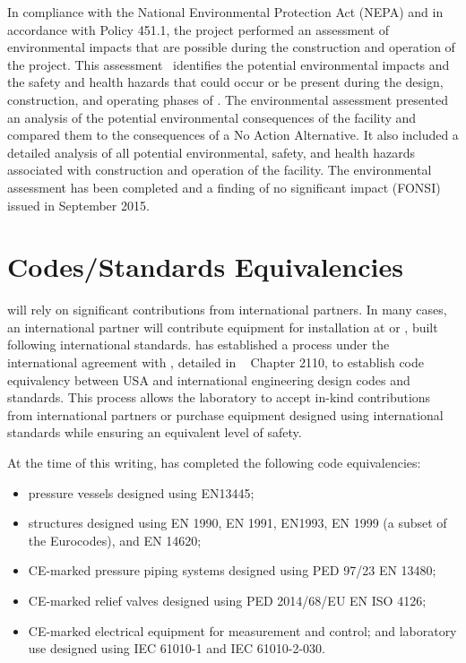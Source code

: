 In compliance with the National Environmental Protection Act (NEPA) and in
accordance with  Policy 451.1, the
 project performed an assessment  of %
environmental impacts that are possible during the construction and operation of the
project.  %
This assessment~\cite{bib:docdb122}   identifies the
potential environmental impacts and the safety and health hazards
that could occur or be present during the design, construction, and operating phases of
.  The environmental assessment presented an
analysis of the potential environmental consequences of the facility
and compared them to the consequences of a No Action Alternative. %
It also included a detailed analysis of all potential environmental,
safety, and health hazards associated with construction and operation
of the facility.  The environmental assessment has been completed and
a finding of no significant impact (FONSI)~\cite{bib:docdb122} issued in September 2015.


\section{Codes/Standards Equivalencies}
\label{sec:esh_codes}

 will rely on significant contributions from international
partners. In many cases, an international partner will contribute
equipment for installation at  or , built
following international standards.  has established a
process under the international agreement with , detailed
in ~\cite{FNAL:FESHM2000} Chapter 2110, to establish code equivalency between
USA and international engineering design codes and standards. This
process allows the laboratory to accept in-kind contributions from
international partners or purchase equipment designed using
international standards while ensuring an equivalent level
of safety.

At the time of this writing,  has completed the following code
equivalencies:
\begin{itemize}
 \item pressure vessels designed using EN13445;
 \item structures designed using EN 1990, EN 1991, EN1993, EN 1999 (a
   subset of the Eurocodes), and EN 14620;
 \item CE-marked pressure piping systems designed using PED 97/23 EN 13480;
 \item CE-marked relief valves designed using PED 2014/68/EU EN ISO 4126;
 \item CE-marked electrical equipment for measurement and control; and
   laboratory use designed using IEC 61010-1 and IEC 61010-2-030.
\end{itemize}

